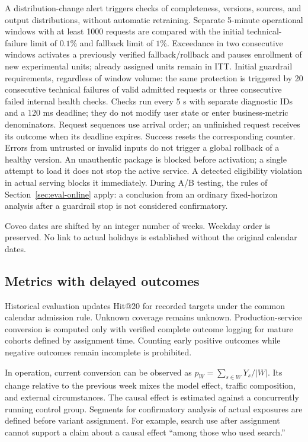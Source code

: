 \documentclass[12pt,a4paper]{article}
\theoremstyle{plainru}
\begin{document}
A distribution-change alert triggers checks of completeness, versions, sources,
and output distributions, without automatic retraining.
Separate 5-minute operational windows with at least 1000 requests
are compared with the initial technical-failure limit of $0.1\%$
and fallback limit of $1\%$. Exceedance in two consecutive windows
activates a previously verified fallback/rollback and pauses
enrollment of new experimental units; already assigned units remain in ITT.
Initial guardrail requirements, regardless of window volume:
the same protection is triggered by 20 consecutive
technical failures of valid admitted requests or three consecutive failed
internal health checks. Checks run
every 5 s with separate diagnostic IDs and a 120 ms deadline; they do not
modify user state or enter business-metric denominators.
Request sequences use arrival order;
an unfinished request receives its outcome when its deadline expires.
Success resets the corresponding counter. Errors from untrusted or
invalid inputs do not trigger a global rollback of a healthy version.
An unauthentic package is blocked before activation; a single attempt to
load it does not stop the active service. A detected eligibility violation
in actual serving blocks it immediately.
During A/B testing, the rules of Section~\ref{sec:eval-online} apply:
a conclusion from an ordinary fixed-horizon analysis after a guardrail
stop is not considered confirmatory.

Coveo dates are shifted by an integer number of weeks. Weekday
order is preserved. No link to actual holidays is established
without the original calendar dates.

\subsection{Metrics with delayed outcomes}

Historical evaluation updates Hit@20 for recorded targets
under the common calendar admission rule. Unknown coverage remains unknown.
Production-service conversion is computed only with verified
complete outcome logging for mature cohorts defined by assignment time.
Counting early positive outcomes while negative outcomes remain incomplete is prohibited.

In operation, current conversion can be observed as
\(\widehat p_W=\sum_{s\in W}Y_s/|W|\).
Its change relative to the previous week mixes the model effect,
traffic composition, and external circumstances. The causal effect
is estimated against a concurrently running control group.
Segments for confirmatory analysis of actual exposures are defined before variant
assignment. For example, search use after assignment cannot
support a claim about a causal effect
``among those who used search.''
\end{document}
